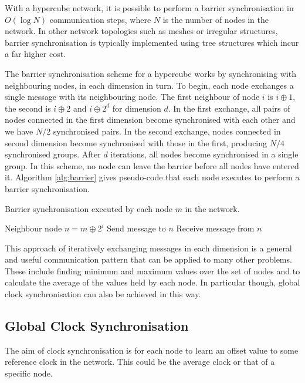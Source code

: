 With a hypercube network, it is possible to perform a barrier synchronisation in
$O(\log N)$ communication steps, where $N$ is the number of nodes in the
network. In other network topologies such as meshes or irregular structures,
barrier synchronisation is typically implemented using tree structures which
incur a far higher cost.

The barrier synchronisation scheme for a hypercube works by synchronising with
neighbouring nodes, in each dimension in turn. To begin, each node exchanges a
single message with its neighbouring node. The first neighbour of node $i$ is $i
\oplus 1$, the second is $i \oplus 2$ and $i \oplus 2^d$ for dimension $d$.  In
the first exchange, all pairs of nodes connected in the first dimension become
synchronised with each other and we have $N/2$ synchronised pairs. In the second
exchange, nodes connected in second dimension become synchronised with those in
the first, producing $N/4$ synchronised groups. After $d$ iterations, all nodes
become synchronised in a single group. In this scheme, no node can leave the
barrier before all nodes have entered it. Algorithm \ref{alg:barrier} gives
pseudo-code that each node executes to perform a barrier synchronisation.

\begin{algorithm}
\caption{Barrier synchronisation executed by each node $m$ in the network.}
\label{alg:barrier}
\begin{algorithmic}
\STATE Neighbour node $n = m \oplus 2^i$
\STATE Send message to $n$
\STATE Receive message from $n$
\ENDFOR
\end{algorithmic}
\end{algorithm}

This approach of iteratively exchanging messages in each dimension is a general
and useful communication pattern that can be applied to many other problems.
These include finding minimum and maximum values over the set of nodes and to
calculate the average of the values held by each node. In particular though,
global clock synchronisation can also be achieved in this way.

\subsection{Global Clock Synchronisation}

The aim of clock synchronisation is for each node to learn an offset value to
some reference clock in the network. This could be the average clock or that of
a specific node.

